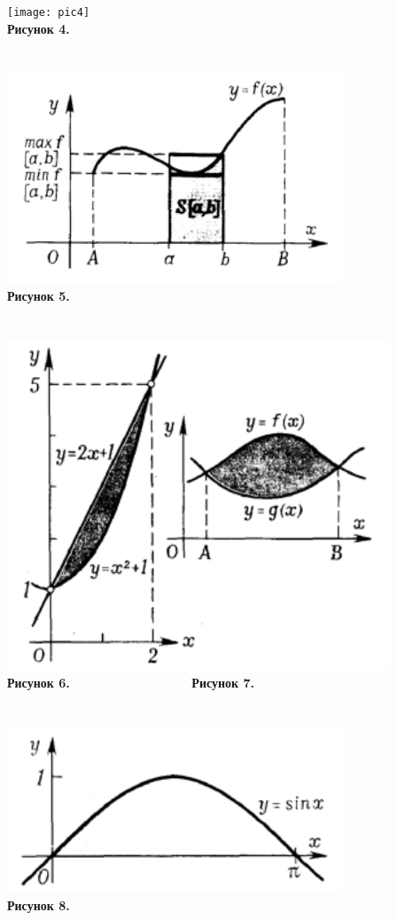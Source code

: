 \begin{minipage}[]{0.45\textwidth}

\texttt{[image: pic4]} \\
\textbf{Рисунок 4.} \\ \\ \\
\includegraphics[scale=0.85]{images/pic5.png} \\
\textbf{Рисунок 5.} \\ \\ \\
\includegraphics[scale=0.85]{images/pic67.png} \\
\textbf{Рисунок 6.} \ \ \ \ \ \ \ \ \ \ \ \ \ \ \ \ \ \ \ \textbf{Рисунок 7.}\\ \\ \\
\includegraphics[scale=0.85]{images/pic8.png} \\
\textbf{Рисунок 8.} \\ \\ \\
\end{minipage}
